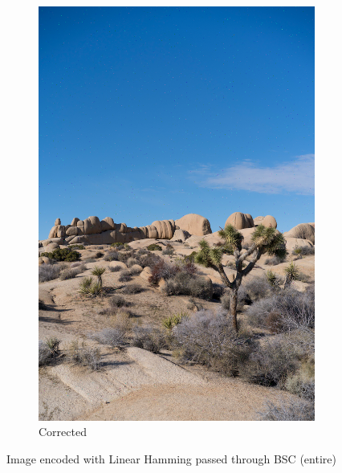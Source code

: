 \documentclass{article}
\begin{document}
\begin{figure}[htb]
\begin{subfigure}[b]{0.32\textwidth}
        \includegraphics[width=\textwidth]{../Result/linear-bsc-output-syndrome-corrected.png}
        \caption{Corrected}
        \label{fig:image-linear-bsc-syndrome-corrected}
    \end{subfigure}
       \caption{Image encoded with Linear Hamming passed through BSC (entire)}
       \label{fig:image-linear-bsc}
\end{figure}
\end{document}
